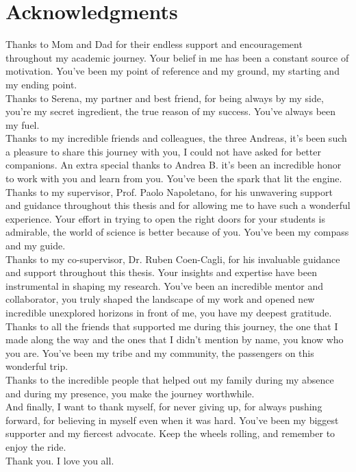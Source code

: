\chapter*{Acknowledgments}

Thanks to Mom and Dad for their endless support and encouragement throughout my academic journey. Your belief in me has been a constant source of motivation. You've been my point of reference and my ground, my starting and my ending point.\\
Thanks to Serena, my partner and best friend, for being always by my side, you're my secret ingredient, the true reason of my success. You've always been my fuel.\\
Thanks to my incredible friends and colleagues, the three Andreas, it's been such a pleasure to share this journey with you, I could not have asked for better companions. An extra special thanks to Andrea B. it's been an incredible honor to work with you and learn from you. You've been the spark that lit the engine.\\
Thanks to my supervisor, Prof. Paolo Napoletano, for his unwavering support and guidance throughout this thesis and for allowing me to have such a wonderful experience. Your effort in trying to open the right doors for your students is admirable, the world of science is better because of you. You've been my compass and my guide.\\
Thanks to my co-supervisor, Dr. Ruben Coen-Cagli, for his invaluable guidance and support throughout this thesis. Your insights and expertise have been instrumental in shaping my research. You've been an incredible mentor and collaborator, you truly shaped the landscape of my work and opened new incredible unexplored horizons in front of me, you have my deepest gratitude.\\
Thanks to all the friends that supported me during this journey, the one that I made along the way and the ones that I didn't mention by name, you know who you are. You've been my tribe and my community, the passengers on this wonderful trip.\\
Thanks to the incredible people that helped out my family during my absence and during my presence, you make the journey worthwhile.\\
And finally, I want to thank myself, for never giving up, for always pushing forward, for believing in myself even when it was hard. You've been my biggest supporter and my fiercest advocate. Keep the wheels rolling, and remember to enjoy the ride.\\
Thank you. I love you all.\\
\thispagestyle{empty}
\mbox{}
\newpage

